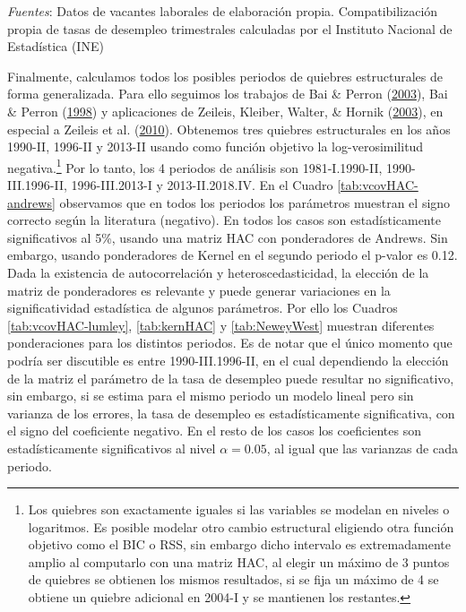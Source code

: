 \documentclass[12pt,oneside]{reedthesis}
\begin{document}
\begin{table}[!h]
\begin{threeparttable}
\begin{tablenotes}
\textit{Fuentes}: Datos de vacantes laborales de elaboración propia. Compatibilización propia de tasas de desempleo trimestrales calculadas por el Instituto Nacional de Estadística (INE)
\end{tablenotes}
\end{threeparttable}
\end{table}
Finalmente, calculamos todos los posibles periodos de quiebres estructurales de forma generalizada. Para ello seguimos los trabajos de Bai \& Perron (\protect\hyperlink{ref-BaiPerron2003}{2003}), Bai \& Perron (\protect\hyperlink{ref-BaiPerron1998}{1998}) y aplicaciones de Zeileis, Kleiber, Walter, \& Hornik (\protect\hyperlink{ref-Zeileis2003}{2003}), en especial a Zeileis et al. (\protect\hyperlink{ref-Zeileis2010}{2010}). Obtenemos tres quiebres estructurales en los años 1990-II, 1996-II y 2013-II usando como función objetivo la log-verosimilitud negativa.\footnote{Los quiebres son exactamente iguales si las variables se modelan en niveles o logaritmos. Es posible modelar otro cambio estructural eligiendo otra función objetivo como el BIC o RSS, sin embargo dicho intervalo es extremadamente amplio al computarlo con una matriz HAC, al elegir un máximo de 3 puntos de quiebres se obtienen los mismos resultados, si se fija un máximo de 4 se obtiene un quiebre adicional en 2004-I y se mantienen los restantes.} Por lo tanto, los 4 periodos de análisis son 1981-I.1990-II, 1990-III.1996-II, 1996-III.2013-I y 2013-II.2018.IV. En el Cuadro \ref{tab:vcovHAC-andrews} observamos que en todos los periodos los parámetros muestran el signo correcto según la literatura (negativo). En todos los casos son estadísticamente significativos al 5\%, usando una matriz HAC con ponderadores de Andrews. Sin embargo, usando ponderadores de Kernel en el segundo periodo el p-valor es 0.12. Dada la existencia de autocorrelación y heteroscedasticidad, la elección de la matriz de ponderadores es relevante y puede generar variaciones en la significatividad estadística de algunos parámetros. Por ello los Cuadros \ref{tab:vcovHAC-lumley}, \ref{tab:kernHAC} y \ref{tab:NeweyWest} muestran diferentes ponderaciones para los distintos periodos. Es de notar que el único momento que podría ser discutible es entre 1990-III.1996-II, en el cual dependiendo la elección de la matriz el parámetro de la tasa de desempleo puede resultar no significativo, sin embargo, si se estima para el mismo periodo un modelo lineal pero sin varianza de los errores, la tasa de desempleo es estadísticamente significativa, con el signo del coeficiente negativo. En el resto de los casos los coeficientes son estadísticamente significativos al nivel \(\alpha = 0.05\), al igual que las varianzas de cada periodo.
\end{document}
